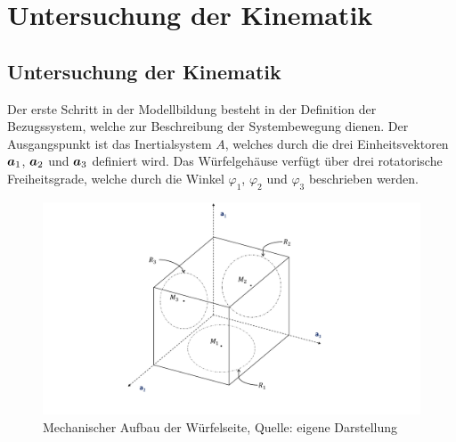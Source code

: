 \section{Untersuchung der Kinematik}
\subsection{Untersuchung der Kinematik}
Der erste Schritt in der Modellbildung besteht in der Definition der Bezugssystem, welche zur Beschreibung der Systembewegung dienen. Der Ausgangspunkt ist das Inertialsystem $A$, welches durch die drei Einheitsvektoren $\boldsymbol{a}_1$, $\boldsymbol{a}_2$ und $\boldsymbol{a}_3$ definiert wird. Das Würfelgehäuse verfügt über drei rotatorische Freiheitsgrade, welche durch die Winkel $\varphi_1$, $\varphi_2$ und $\varphi_3$ beschrieben werden. 

\begin{figure}[!h]
\centering
\includegraphics[width=\linewidth, trim={3cm 1.5cm 4cm 0cm}, clip]{img/MechAufbau3D}
\caption{Mechanischer Aufbau der Würfelseite, Quelle: eigene Darstellung}
\end{figure}

